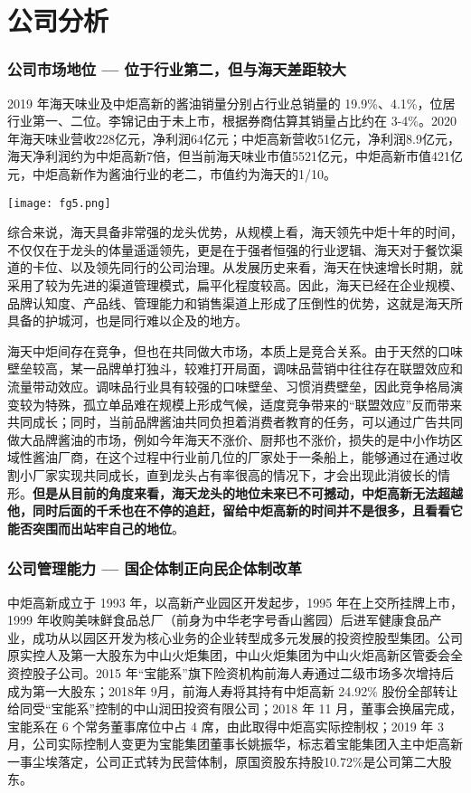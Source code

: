 \documentclass[UTF8,a4paper,zihao=-4,fontset = windows]{ctexart} %
\begin{document}
\part{公司分析}
\section{公司市场地位 — 位于行业第二，但与海天差距较大}
2019 年海天味业及中炬高新的酱油销量分别占行业总销量的 19.9\%、4.1\%，位居行业第一、二位。李锦记由于未上市，根据券商估算其销量占比约在 3-4\%。2020年海天味业营收228亿元，净利润64亿元；中炬高新营收51亿元，净利润8.9亿元，海天净利润约为中炬高新7倍，但当前海天味业市值5521亿元，中炬高新市值421亿元，中炬高新作为酱油行业的老二，市值约为海天的1/10。

\texttt{[image: fg5.png]} 

综合来说，海天具备非常强的龙头优势，从规模上看，海天领先中炬十年的时间，不仅仅在于龙头的体量遥遥领先，更是在于强者恒强的行业逻辑、海天对于餐饮渠道的卡位、以及领先同行的公司治理。从发展历史来看，海天在快速增长时期，就采用了较为先进的渠道管理模式，扁平化程度较高。因此，海天已经在企业规模、品牌认知度、产品线、管理能力和销售渠道上形成了压倒性的优势，这就是海天所具备的护城河，也是同行难以企及的地方。


海天中炬间存在竞争，但也在共同做大市场，本质上是竞合关系。由于天然的口味壁垒较高，某一品牌单打独斗，较难打开局面，调味品营销中往往存在联盟效应和流量带动效应。调味品行业具有较强的口味壁垒、习惯消费壁垒，因此竞争格局演变较为特殊，孤立单品难在规模上形成气候，适度竞争带来的“联盟效应”反而带来共同成长；同时，当前品牌酱油共同负担着消费者教育的任务，可以通过广告共同做大品牌酱油的市场，例如今年海天不涨价、厨邦也不涨价，损失的是中小作坊区域性酱油厂商，在这个过程中行业前几位的厂家处于一条船上，能够通过在通过收割小厂家实现共同成长，直到龙头占有率很高的情况下，才会出现此消彼长的情形。\textbf{但是从目前的角度来看，海天龙头的地位未来已不可撼动，中炬高新无法超越他，同时后面的千禾也在不停的追赶，留给中炬高新的时间并不是很多，且看看它能否突围而出站牢自己的地位}。

\section{公司管理能力 — 国企体制正向民企体制改革}
中炬高新成立于 1993 年，以高新产业园区开发起步，1995 年在上交所挂牌上市，1999 年收购美味鲜食品总厂（前身为中华老字号香山酱园）后进军健康食品产业，成功从以园区开发为核心业务的企业转型成多元发展的投资控股型集团。公司原实控人及第一大股东为中山火炬集团，中山火炬集团为中山火炬高新区管委会全资控股子公司。2015 年“宝能系”旗下险资机构前海人寿通过二级市场多次增持后成为第一大股东；2018年 9月，前海人寿将其持有中炬高新 24.92\% 股份全部转让给同受“宝能系”控制的中山润田投资有限公司；2018 年 11 月，董事会换届完成，宝能系在 6 个常务董事席位中占 4 席，由此取得中炬高实际控制权；2019 年 3 月，公司实际控制人变更为宝能集团董事长姚振华，标志着宝能集团入主中炬高新一事尘埃落定，公司正式转为民营体制，原国资股东持股10.72\%是公司第二大股东。
\end{document}

